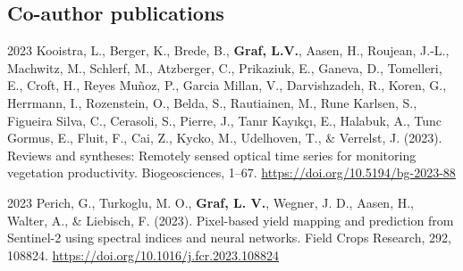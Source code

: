 \begin{cv}{}
\begin{cvlist}{}
\end{cvlist}

\subsection{Co-author publications}

\begin{cvlist}

    \item[2023]
    Kooistra, L., Berger, K., Brede, B., \textbf{Graf, L.V.}, Aasen, H., Roujean, J.-L., Machwitz, M., Schlerf, M., Atzberger, C., Prikaziuk, E., Ganeva, D., Tomelleri, E., Croft, H., Reyes Muñoz, P., Garcia Millan, V., Darvishzadeh, R., Koren, G., Herrmann, I., Rozenstein, O., Belda, S., Rautiainen, M., Rune Karlsen, S., Figueira Silva, C., Cerasoli, S., Pierre, J., Tanır Kayıkçı, E., Halabuk, A., Tunc Gormus, E., Fluit, F., Cai, Z., Kycko, M., Udelhoven, T., \& Verrelst, J. (2023). Reviews and syntheses: Remotely sensed optical time series for monitoring vegetation productivity. Biogeosciences, 1–67. \url{https://doi.org/10.5194/bg-2023-88}

    \item[2023]
    Perich, G., Turkoglu, M. O., \textbf{Graf, L. V.}, Wegner, J. D., Aasen, H., Walter, A., \& Liebisch, F. (2023). Pixel-based yield mapping and prediction from Sentinel-2 using spectral indices and neural networks. Field Crops Research, 292, 108824. \url{https://doi.org/10.1016/j.fcr.2023.108824}

 
\end{cvlist}

\end{cv}
